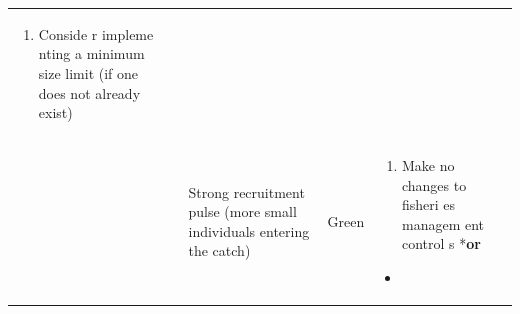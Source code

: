 \documentclass[]{book}
\providecommand{\tightlist}{%
  \setlength{\itemsep}{0pt}\setlength{\parskip}{0pt}}
\begin{document}
\begin{longtable}[]{@{}lllll@{}}
\begin{minipage}[t]{0.19\columnwidth}
\begin{enumerate}
\def\labelenumi{\arabic{enumi}.}
\tightlist
\item
  Conside r impleme nting a minimum size limit (if one does not already
  exist)
\end{enumerate}\strut
\end{minipage}\tabularnewline
\begin{minipage}[t]{0.19\columnwidth}\raggedright\strut
\strut
\end{minipage} & \begin{minipage}[t]{0.19\columnwidth}\raggedright\strut
\strut
\end{minipage} & \begin{minipage}[t]{0.19\columnwidth}\raggedright\strut
Strong recruitment pulse (more small individuals entering the
catch)\strut
\end{minipage} & \begin{minipage}[t]{0.19\columnwidth}\raggedright\strut
Green\strut
\end{minipage} & \begin{minipage}[t]{0.19\columnwidth}\raggedright\strut
\begin{enumerate}
\def\labelenumi{\arabic{enumi}.}
\tightlist
\item
  Make no changes to fisheri es managem ent control s *\textbf{or}
\end{enumerate}

\begin{itemize}
\item
\end{itemize}


\end{minipage}
\end{longtable}
\end{document}
